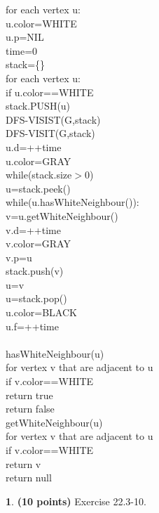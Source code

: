 \documentclass[11pt]{article}
\theoremstyle{definition}
\theoremstyle{theorem}
\newtheorem{prob}{}
\begin{document}
\null\qquad for each vertex u:\\
\null\qquad\qquad u.color=WHITE\\
\null\qquad\qquad u.p=NIL\\
\null\qquad time=0\\
\null\qquad stack=\{\}\\
\null\qquad for each vertex u:\\
\null\qquad\qquad if u.color==WHITE\\
\null\qquad\qquad\qquad stack.PUSH(u)\\
\null\qquad\qquad\qquad DFS-VISIST(G,stack)\\
DFS-VISIT(G,stack)\\
\null\qquad u.d=++time\\
\null\qquad u.color=GRAY\\
\null\qquad while(stack.size$>$0)\\
\null\qquad\qquad u=stack.peek()\\
\null\qquad\qquad while(u.hasWhiteNeighbour()):\\
\null\qquad\qquad\qquad v=u.getWhiteNeighbour()\\
\null\qquad\qquad\qquad v.d=++time\\
\null\qquad\qquad\qquad v.color=GRAY\\
\null\qquad\qquad\qquad v.p=u\\
\null\qquad\qquad\qquad stack.push(v)\\
\null\qquad\qquad\qquad u=v\\
\null\qquad\qquad u=stack.pop()\\
\null\qquad\qquad u.color=BLACK\\
\null\qquad\qquad u.f=++time\\\\
hasWhiteNeighbour(u)\\
\null\qquad for vertex v that are adjacent to u\\
\null\qquad\qquad if v.color==WHITE\\
\null\qquad\qquad\qquad return true\\
\null\qquad return false\\
getWhiteNeighbour(u)\\
\null\qquad for vertex v that are adjacent to u\\
\null\qquad\qquad if v.color==WHITE\\
\null\qquad\qquad\qquad return v\\
\null\qquad return null\\
\begin{prob} \textbf{(10 points)} Exercise 22.3-10.
\end{prob}
\end{document}
